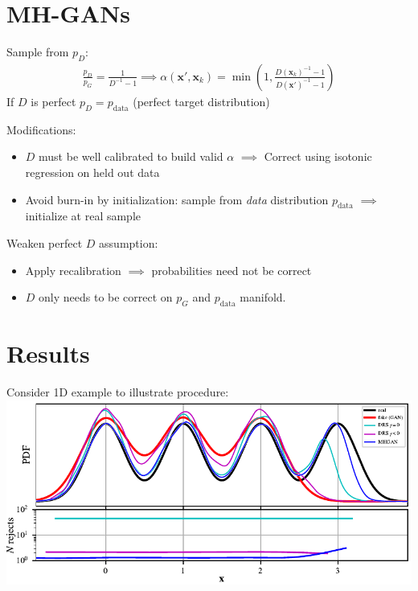 \documentclass[a0,landscape]{a0poster}
\newcommand{\mysection}[1]{\section*{\fontsize{67.1}{82} \selectfont \color{NavyBlue} #1 \color{Black}}}
\renewcommand{\vec}[1]{{\boldsymbol{\mathbf{#1}}}} %
\newcommand{\PG}{{p_G}}
\newcommand{\PD}{{p_D}}
\newcommand{\PR}{{p_{\textrm{data}}}}
\newcommand{\accept}{\alpha}
\begin{document}
\begin{multicols}{3}
\mysection{MH-GANs}

Sample from $\PD$:
\begin{align}
  \frac{\PD}{\PG} = \frac{1}{D^{-1} - 1} \implies
  \accept(\vec x', \vec x_k) = \min\left(1, \frac{D(\vec x_k)^{-1} - 1}{D(\vec x')^{-1} - 1}\right)
\end{align}
If $D$ is perfect $\PD = \PR$ (perfect target distribution)

Modifications:
\begin{itemize}
  \item $D$ must be well calibrated to build valid $\accept$ $\implies$ Correct using isotonic regression on held out data
  \item Avoid burn-in by initialization: sample from \emph{data} distribution $\PR$ $\implies$ initialize at real sample
\end{itemize}

Weaken perfect $D$ assumption:
\begin{itemize}
  \item Apply recalibration $\implies$ probabilities need not be correct
  \item $D$ only needs to be correct on $\PG$ and $\PR$ manifold.
\end{itemize}

\mysection{Results}

Consider 1D example to illustrate procedure:\\
\includegraphics[scale=2.5]{../figures/univariate_example.pdf}


\end{multicols}
\end{document}
